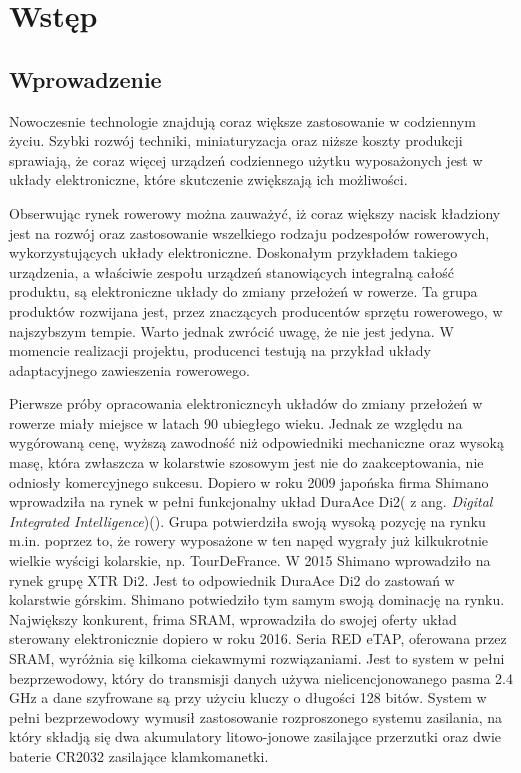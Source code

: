 \chapter{Wstęp}
\label{cha:Wstęp}

\section{Wprowadzenie}
\label{sec:Wprowadzenie}
Nowoczesnie technologie znajdują coraz większe zastosowanie w codziennym życiu. Szybki rozwój techniki, miniaturyzacja oraz niższe koszty produkcji sprawiają, że coraz więcej urządzeń codziennego użytku wyposażonych jest w układy elektroniczne, które skutczenie zwiększają ich możliwości. 

Obserwując rynek rowerowy można zauważyć, iż coraz większy nacisk kładziony jest na rozwój oraz zastosowanie wszelkiego rodzaju podzespołów rowerowych, wykorzystujących układy elektroniczne. Doskonałym przykładem takiego urządzenia, a właściwie zespołu urządzeń stanowiących integralną całość produktu, są elektroniczne układy do zmiany przełożeń w rowerze. Ta grupa produktów rozwijana jest, przez znaczących producentów sprzętu rowerowego, w najszybszym tempie. Warto jednak zwrócić uwagę, że nie jest jedyna. W momencie realizacji projektu, producenci testują na przykład układy adaptacyjnego zawieszenia rowerowego.   

Pierwsze próby opracowania elektroniczncyh układów do zmiany przełożeń w rowerze miały miejsce w latach 90 ubiegłego wieku. Jednak ze względu na wygórowaną cenę, wyższą zawodność niż odpowiedniki mechaniczne oraz wysoką masę, która zwłaszcza w kolarstwie szosowym jest nie do zaakceptowania, nie odniosły komercyjnego sukcesu. Dopiero w roku 2009 japońska firma Shimano wprowadziła na rynek w pełni funkcjonalny układ DuraAce Di2( z ang. {\em Digital Integrated Intelligence})(\cite{shimanoHistory}). Grupa potwierdziła swoją wysoką pozycję na rynku m.in. poprzez to, że rowery wyposażone w ten napęd wygrały już kilkukrotnie wielkie wyścigi kolarskie, np. TourDeFrance. W 2015 Shimano wprowadziło na rynek grupę XTR Di2. Jest to odpowiednik DuraAce Di2 do zastowań w kolarstwie górskim. Shimano potwiedziło tym samym swoją dominację na rynku. Największy konkurent, frima SRAM, wprowadziła do swojej oferty układ sterowany elektronicznie dopiero w roku 2016. Seria RED eTAP, oferowana przez SRAM, wyróżnia się kilkoma ciekawmymi rozwiązaniami. Jest to system w pełni bezprzewodowy, który do transmisji danych używa nielicencjonowanego pasma 2.4 GHz a dane szyfrowane są przy użyciu kluczy o długości 128 bitów. System w pełni bezprzewodowy wymusił zastosowanie rozproszonego systemu zasilania, na który składją się dwa akumulatory litowo-jonowe zasilające przerzutki oraz dwie baterie CR2032 zasilające klamkomanetki\cite{bikeWorld}.

